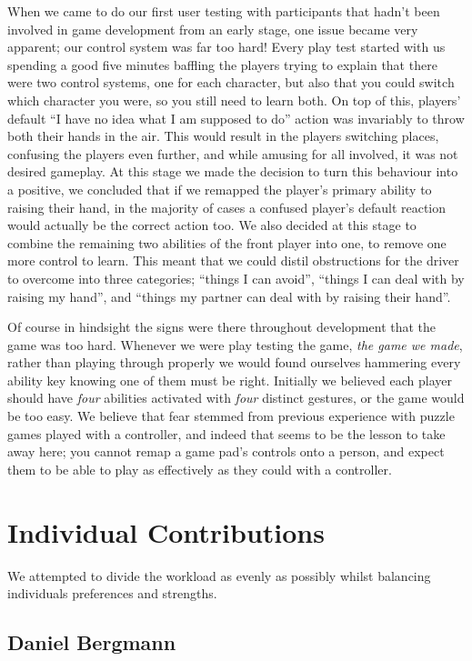 \documentclass[a4paper,oneside]{memoir}
\begin{document}
			When we came to do our first user testing with participants that hadn't been involved in game development from an early stage, one issue became very apparent; our control system was far too hard!
			Every play test started with us spending a good five minutes baffling the players trying to explain that there were two control systems, one for each character, but also that you could switch which character you were, so you still need to learn both.
			On top of this, players' default ``I have no idea what I am supposed to do'' action was invariably to throw both their hands in the air.
			This would result in the players switching places, confusing the players even further, and while amusing for all involved, it was not desired gameplay.
			At this stage we made the decision to turn this behaviour into a positive, we concluded that if we remapped the player's primary ability to raising their hand, in the majority of cases a confused player's default reaction would actually be the correct action too.
			We also decided at this stage to combine the remaining two abilities of the front player into one, to remove one more control to learn. 
			This meant that we could distil obstructions for the driver to overcome into three categories; ``things I can avoid'', ``things I can deal with by raising my hand'', and ``things my partner can deal with by raising their hand''.

			Of course in hindsight the signs were there throughout development that the game was too hard. 
			Whenever we were play testing the game, \emph{the game we made}, rather than playing through properly we would found ourselves hammering every ability key knowing one of them must be right.
			Initially we believed each player should have \emph{four} abilities activated with \emph{four} distinct gestures, or the game would be too easy.
			We believe that fear stemmed from previous experience with puzzle games played with a controller, and indeed that seems to be the lesson to take away here; you cannot remap a game pad's controls onto a person, and expect them to be able to play as effectively as they could with a controller.

	\chapter{Individual Contributions}

		We attempted to divide the workload as evenly as possibly whilst balancing individuals preferences and strengths.

		\section{Daniel Bergmann}
			
\end{document}
